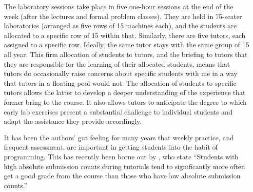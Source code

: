 \documentclass[conference,compsoc]{IEEEtran}
\begin{document}
 The laboratory sessions take place in five one-hour sessions at the end of the week (after the lectures and formal problem classes). They are held in 75-seater laboratories (arranged as five rows of 15 machines each), and the students are allocated to a specific row of 15 within that. Similarly, there are five tutors, each assigned to a specific row. Ideally, the same tutor stays with the same group of 15 all year. This firm allocation of students to tutors, and the briefing to tutors that they are responsible for the learning of their allocated students, means that tutors do occasionally raise concerns about specific students with me in a way that tutors in a floating pool would not. The allocation of students to specific tutors allows the latter to develop a deeper understanding of the experience that former bring to the course. It also allows tutors to anticipate the degree to which early lab exercises present a substantial challenge to individual students and adapt the assistance they provide accordingly.
 
It has been the authors' gut feeling for many years that weekly practice, and frequent assessment, are important in getting students into the habit of programming. This has recently been borne out by \cite{Willman}, who state ``Students with high absolute submission counts during tutorials tend to significantly more often get a good grade from the course than those who have low absolute submission counts.''
\end{document}
